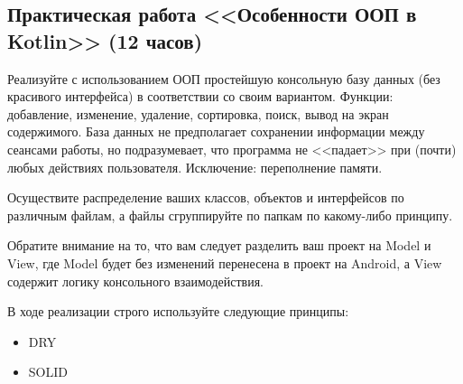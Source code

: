 \subsection{Практическая работа <<Особенности ООП в Kotlin>> (12 часов)} 

Реализуйте с использованием ООП простейшую консольную базу данных (без красивого интерфейса) в соответствии со своим вариантом. 
Функции: добавление, изменение, удаление, сортировка, поиск, вывод на экран содержимого. База данных не предполагает сохранении информации между
сеансами работы, но подразумевает, что программа не <<падает>> при (почти) любых действиях пользователя. Исключение: переполнение памяти.

Осуществите распределение ваших классов, объектов и интерфейсов по различным файлам, а файлы сгруппируйте по папкам по какому-либо принципу.

Обратите внимание на то, что вам следует разделить ваш проект на Model и View, где Model будет без изменений перенесена в проект на Android, 
а View содержит логику консольного взаимодействия.

В ходе реализации строго используйте следующие принципы:
\begin{itemize}
	\item DRY
	\item SOLID
\end{itemize}

